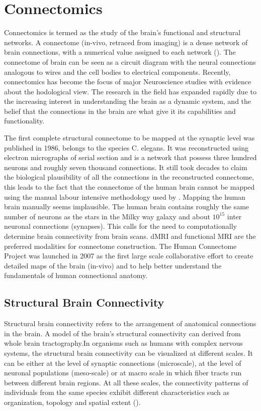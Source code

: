 \documentclass[msthesis.tex]{subfiles}
\begin{document}
\section{Connectomics}
\label{sec:connectomics}
Connectomics is termed as the study of the brain's functional and structural networks. A connectome (in-vivo, retraced from imaging) is a dense network of brain connections, with a numerical value assigned to each network (\cite{bassett2017network}). The connectome of brain can be seen as a circuit diagram with the neural connections analogous to wires and the cell bodies to electrical components.
Recently, connectomics has become the focus of major Neuroscience studies with evidence about the hodological view. The research in the field has expanded rapidly due to the increasing interest in understanding the brain as a dynamic system, and the belief that the connections in the brain are what give it its capabilities and functionality. \cite{network_neuroscience_editorial}

The first complete structural connectome to be mapped at the synaptic level was published in 1986,  belongs to the species C. elegans. It was reconstructed using electron micrographs of serial section and is a network that possess three hundred neurons and roughly seven thousand connections. It still took decades to claim the biological plausibility of all the connections in the reconstructed connectome\cite{elegans}, this leads to the fact that the connectome of the human brain cannot be mapped using the manual labour intensive methodology used by \cite{white1986structure}. Mapping the human brain manually seems implausible. The human brain contains roughly the same number of neurons as the stars in the Milky way galaxy and about $10^{15}$ inter neuronal connections (synapses)\cite{fornito2015connectomics}. This calls for the need to computationally determine brain connectivity from brain scans. dMRI and functional MRI are the preferred modalities for connectome construction. The Human Connectome Project was launched in 2007 as the first large scale collaborative effort to create detailed maps of the brain (in-vivo) and to help better understand the fundamentals of human connectional anatomy.

\subsection{Structural Brain Connectivity}
Structural brain connectivity refers to the arrangement of anatomical connections in the brain. A model of the brain's structural connectivity can derived from whole brain tractography.In organisms such as humans with complex nervous systems, the structural brain connectivity can be visualized at different scales. It can be either at the level of synaptic connections (microscale), at the level of neuronal populations (meso-scale) or at macro scale in which fiber tracts run between different brain regions. At all these scales, the connectivity patterns of individuals from the same species exhibit different characteristics such as organization, topology and spatial extent (\cite{Sporns:2007}).
\end{document}
